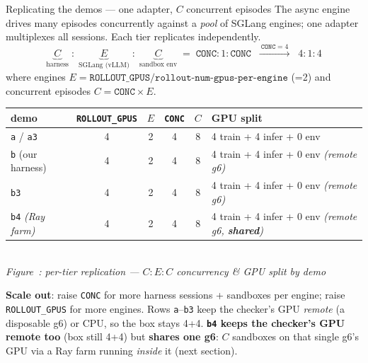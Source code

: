\documentclass[aspectratio=169]{beamer}
\newcounter{deckfig}
\newcommand{\figtag}[1]{\refstepcounter{deckfig}%
  {\scriptsize\itshape Figure~\thedeckfig: #1}}
\begin{document}
\begin{frame}{Replicating the demos --- one adapter, $C$ concurrent episodes}
  \footnotesize The async engine drives many episodes concurrently against a \emph{pool} of SGLang
  engines; one adapter multiplexes all sessions. Each tier replicates independently.
  \[
     \underbrace{C}_{\text{harness}} \;:\;
     \underbrace{E}_{\text{SGLang (vLLM)}} \;:\;
     \underbrace{C}_{\text{sandbox env}} \;=\; \texttt{CONC} : 1 : \texttt{CONC}
     \;\;\xrightarrow{\ \texttt{CONC}=4\ }\;\; 4 : 1 : 4
  \]
  where engines $E = \texttt{ROLLOUT\_GPUS} / \texttt{rollout-num-gpus-per-engine}$ (=2) and
  concurrent episodes $C = \texttt{CONC}\times E$.
  \vspace{0.2em}
  \begin{center}
  \renewcommand{\arraystretch}{1.2}\scriptsize
  \begin{tabular}{lccccl}
    \toprule
    demo & \texttt{ROLLOUT\_GPUS} & $E$ & \texttt{CONC} & $C$ & GPU split \\
    \midrule
    \texttt{a} / \texttt{a3} & 4 & 2 & 4 & 8 & 4 train + 4 infer + 0 env \\
    \texttt{b} (our harness) & 4 & 2 & 4 & 8 & 4 train + 4 infer + 0 env \emph{(remote g6)} \\
    \texttt{b3} & 4 & 2 & 4 & 8 & 4 train + 4 infer + 0 env \emph{(remote g6)} \\
    \texttt{b4} \emph{(Ray farm)} & 4 & 2 & 4 & 8 & 4 train + 4 infer + 0 env \emph{(remote g6, \textbf{shared})} \\
    \bottomrule
  \end{tabular}
  \\[0.1em]\figtag{per-tier replication --- $C:E:C$ concurrency \& GPU split by demo}
  \end{center}
  \vspace{0.1em}
  {\scriptsize \textbf{Scale out}: raise \texttt{CONC} for more harness sessions + sandboxes per
  engine; raise \texttt{ROLLOUT\_GPUS} for more engines. Rows \texttt{a}--\texttt{b3} keep the checker's
  GPU \emph{remote} (a disposable g6) or CPU, so the box stays 4+4. \textbf{\texttt{b4} keeps the
  checker's GPU remote too} (box still 4+4) but \textbf{shares one g6}: $C$ sandboxes on that single
  g6's GPU via a Ray farm running \emph{inside} it (next section).}
\end{frame}
\end{document}
